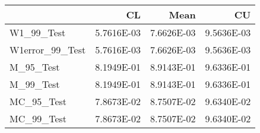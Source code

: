 \begin{tabular}{lrrr}
\toprule
{} &         CL &       Mean &         CU \\
\midrule
W1\_99\_Test      & 5.7616E-03 & 7.6626E-03 & 9.5636E-03 \\
W1error\_99\_Test & 5.7616E-03 & 7.6626E-03 & 9.5636E-03 \\
M\_95\_Test       & 8.1949E-01 & 8.9143E-01 & 9.6336E-01 \\
M\_99\_Test       & 8.1949E-01 & 8.9143E-01 & 9.6336E-01 \\
MC\_95\_Test      & 7.8673E-02 & 8.7507E-02 & 9.6340E-02 \\
MC\_99\_Test      & 7.8673E-02 & 8.7507E-02 & 9.6340E-02 \\
\bottomrule
\end{tabular}
